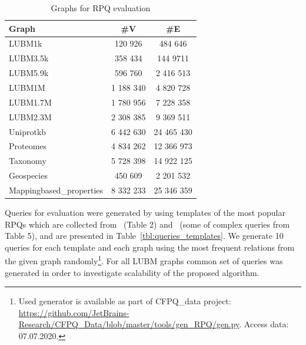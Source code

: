 \begin{table}
\caption{Graphs for RPQ evaluation}
\label{tbl:graphs_for_rpq}
{
\begin{tabular}{|l|c|c|}
\hline
Graph & \#V & \#E  \\
\hline
\hline 
LUBM1k  & 120 926 & 484 646 \\
LUBM3.5k  & 358 434 & 144 9711 \\
LUBM5.9k  & 596 760 & 2 416 513 \\
LUBM1M   & 1 188 340 & 4 820 728 \\
LUBM1.7M & 1 780 956 & 7 228 358 \\
LUBM2.3M & 2 308 385 & 9 369 511 \\
\hline
Uniprotkb & 6 442 630 & 24 465 430 \\
Proteomes & 4 834 262 & 12 366 973 \\
Taxonomy & 5 728 398 & 14 922 125 \\
\hline
Geospecies & 450 609 & 2 201 532 \\
Mappingbased\_properties & 8 332 233 & 25 346 359 \\
\hline
\end{tabular}
}
\end{table}


Queries for evaluation were generated by using templates of the most popular RPQs which are collected from~
\cite{Pacaci2020RegularPQ} (Table 2) and~\cite{Wang2019} (some of complex queries from Table 5), and are presented in Table~\ref{tbl:queries_templates}.
We generate 10 queries for each template and each graph using the most frequent relations from the given graph randomly\footnote{Used generator is available as part of CFPQ\_data project: \url{https://github.com/JetBrains-Research/CFPQ_Data/blob/master/tools/gen_RPQ/gen.py}. Access data: 07.07.2020.}. 
For all LUBM graphs common set of queries was generated in order to investigate scalability of the proposed algorithm.

